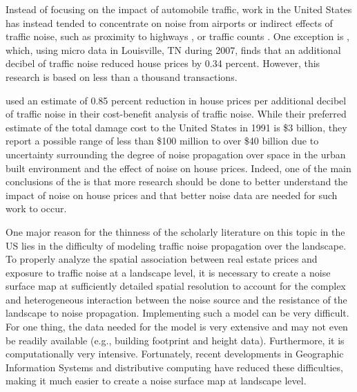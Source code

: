 \documentclass{article}\usepackage{graphicx, color}
\begin{document}
Instead of focusing on the impact of automobile traffic, work in the United States has instead tended to concentrate on noise from airports \citep{Espey2000, McMillen2004, Cohen2008a} or indirect effects of traffic noise, such as proximity to highways \citep{Matthews2007, Chernobai2009, Li2012}, or traffic counts \citep{HughesJr.1992, Larsen2012}. One exception is \citet{Cheng2008}, which, using micro data in Louisville, TN during 2007, finds that an additional decibel of traffic noise reduced house prices by 0.34 percent. However, this research is based on less than a thousand transactions.

\citet{Delucchi1998} used an estimate of 0.85 percent reduction in house prices per additional decibel of traffic noise in their cost-benefit analysis of traffic noise. While their preferred estimate of the total damage cost to the United States in 1991 is \$3 billion, they report a possible range of less than \$100 million to over \$40 billion due to uncertainty surrounding the degree of noise propagation over space in the urban built environment and the effect of noise on house prices. Indeed, one of the main conclusions of the \citet{Delucchi1998} is that more research should be done to better understand the impact of noise on house prices and that better noise data are needed for such work to occur. 

One major reason for the thinness of the scholarly literature on this topic in the US lies in the difficulty of modeling traffic noise propagation over the landscape. To properly analyze the spatial association between real estate prices and exposure to traffic noise at a landscape level, it is necessary to create a noise surface map at sufficiently detailed spatial resolution to account for the complex and heterogeneous interaction between the noise source and the resistance of the landscape to noise propagation.  Implementing such a model can be very difficult.  For one thing, the data needed for the model is very extensive and may not even be readily available (e.g., building footprint and height data).  Furthermore, it is computationally very intensive. Fortunately, recent developments in Geographic Information Systems and distributive computing have reduced these difficulties, making it much easier to create a noise surface map at landscape level.  
\end{document}
